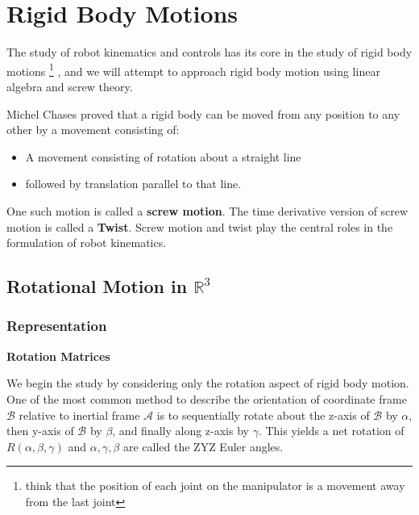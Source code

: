 \documentclass[letterpaper]{article}
\begin{document}
\section{Rigid Body Motions} \label{sec:rbm}
The study of robot kinematics and controls has its core in the study of rigid body motions
\footnote{think that the position of each joint on the manipulator is a movement away from the last joint}
, and we will attempt to approach rigid body motion using linear algebra and screw theory.

Michel Chases proved that a rigid body can be moved from any position to any other by a movement consisting of:\vspace{-0.5em}
\begin{itemize}
    \item A movement consisting of rotation about a straight line\vspace{-1em}
    \item followed by translation parallel to that line. \vspace{-0.5em}
\end{itemize}
One such motion is called a \textbf{screw motion}. The time derivative version of screw motion is called a
\textbf{Twist}. Screw motion and twist play the central roles in the formulation of robot kinematics. 

\subsection{Rotational Motion in $\mathbb{R}^3$}

\subsubsection{Representation} \label{sec:rotmat}
\textbf{Rotation Matrices}

We begin the study by considering only the rotation aspect of rigid body motion. 
One of the most common method to describe the orientation of coordinate frame $\mathcal{B}$ relative to
inertial frame $\mathcal{A}$ is to sequentially rotate about the z-axis of $\mathcal{B}$ by $\alpha$, 
then y-axis of $\mathcal{B}$ by $\beta$, and finally along z-axis by $\gamma$. This yields a net rotation
of $R(\alpha, \beta, \gamma)$ and $\alpha, \gamma, \beta$ are called the ZYZ Euler angles. 
\end{document}
